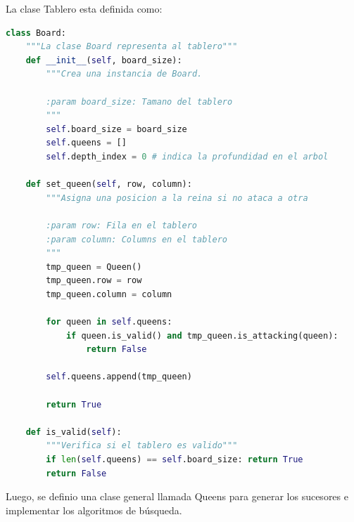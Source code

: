 \documentclass[letter, 10pt]{article}
\begin{document}
La clase Tablero esta definida como:\\

\begin{lstlisting}[language=python,frame=single]
    class Board:
    """La clase Board representa al tablero"""
    def __init__(self, board_size):
        """Crea una instancia de Board.
    
        :param board_size: Tamano del tablero
        """
        self.board_size = board_size
        self.queens = []
        self.depth_index = 0 # indica la profundidad en el arbol
    
    def set_queen(self, row, column):
        """Asigna una posicion a la reina si no ataca a otra

        :param row: Fila en el tablero
        :param column: Columns en el tablero
        """
        tmp_queen = Queen()
        tmp_queen.row = row
        tmp_queen.column = column

        for queen in self.queens:
            if queen.is_valid() and tmp_queen.is_attacking(queen):
                return False

        self.queens.append(tmp_queen)

        return True
    
    def is_valid(self):
        """Verifica si el tablero es valido"""
        if len(self.queens) == self.board_size: return True
        return False
\end{lstlisting}

Luego, se definio una clase general llamada Queens para generar los sucesores e implementar los algoritmos de búsqueda.\\
\end{document}
